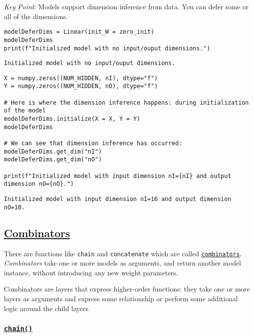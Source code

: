 \documentclass[
]{article}
\begin{document}
\emph{Key Point}: Models support dimension inference from data. You can
defer some or all of the dimensions.

\begin{verbatim}
modelDeferDims = Linear(init_W = zero_init)
modelDeferDims
print(f"Initialized model with no input/ouput dimensions.")
\end{verbatim}

\begin{verbatim}
Initialized model with no input/ouput dimensions.
\end{verbatim}

\begin{verbatim}
X = numpy.zeros((NUM_HIDDEN, nI), dtype="f")
Y = numpy.zeros((NUM_HIDDEN, nO), dtype="f")

# Here is where the dimension inference happens: during initialization of the model
modelDeferDims.initialize(X = X, Y = Y)
modelDeferDims

# We can see that dimension inference has occurred:
modelDeferDims.get_dim("nI")
modelDeferDims.get_dim("nO")

print(f"Initialized model with input dimension nI={nI} and output dimension nO={nO}.")
\end{verbatim}

\begin{verbatim}
Initialized model with input dimension nI=16 and output dimension nO=10.
\end{verbatim}

\hypertarget{combinators}{%
\subsection{\texorpdfstring{\href{https://thinc.ai/docs/api-layers\#combinators}{Combinators}}{Combinators}}\label{combinators}}

There are functions like \texttt{chain} and
\texttt{concatenate} which are called
\href{https://thinc.ai/docs/api-layers\#combinators}{\texttt{combinators}}.
\emph{Combinators} take one or more models as arguments, and return
another model instance, without introducing any new weight parameters.

Combinators are layers that express higher-order functions: they take
one or more layers as arguments and express some relationship or perform
some additional logic around the child layers.

\hypertarget{chain}{%
\subsubsection{\texorpdfstring{\href{https://thinc.ai/docs/api-layers\#chain}{\texttt{chain()}}}{}}\label{chain}}
\end{document}
